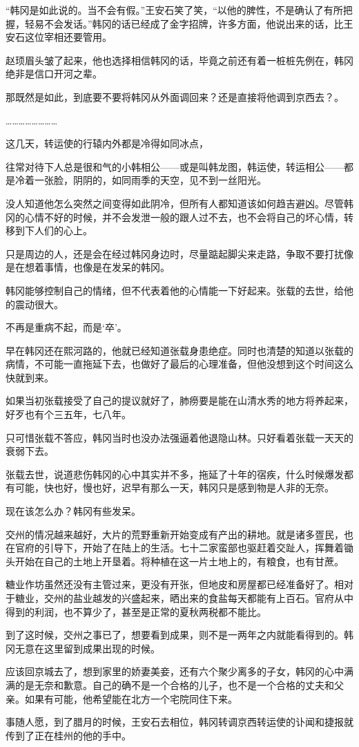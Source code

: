 “韩冈是如此说的。当不会有假。”王安石笑了笑，“以他的脾性，不是确认了有所把握，轻易不会发话。”韩冈的话已经成了金字招牌，许多方面，他说出来的话，比王安石这位宰相还要管用。

赵顼眉头皱了起来，他也选择相信韩冈的话，毕竟之前还有着一桩桩先例在，韩冈绝非是信口开河之辈。

那既然是如此，到底要不要将韩冈从外面调回来？还是直接将他调到京西去？。

……………………

这几天，转运使的行辕内外都是冷得如同冰点，

往常对待下人总是很和气的小韩相公——或是叫韩龙图，韩运使，转运相公——都是冷着一张脸，阴阴的，如同雨季的天空，见不到一丝阳光。

没人知道他怎么突然之间变得如此阴冷，但所有人都知道该如何趋吉避凶。尽管韩冈的心情不好的时候，并不会发泄一般的跟人过不去，也不会将自己的坏心情，转移到下人们的心上。

只是周边的人，还是会在经过韩冈身边时，尽量踮起脚尖来走路，争取不要打扰像是在想着事情，也像是在发呆的韩冈。

韩冈能够控制自己的情绪，但不代表着他的心情能一下好起来。张载的去世，给他的震动很大。

不再是重病不起，而是‘卒’。

早在韩冈还在熙河路的，他就已经知道张载身患绝症。同时也清楚的知道以张载的病情，不可能一直拖延下去，也做好了最后的心理准备，但他没想到这个时间这么快就到来。

如果当初张载接受了自己的提议就好了，肺痨要是能在山清水秀的地方将养起来，好歹也有个三五年，七八年。

只可惜张载不答应，韩冈当时也没办法强逼着他退隐山林。只好看着张载一天天的衰弱下去。

张载去世，说道悲伤韩冈的心中其实并不多，拖延了十年的宿疾，什么时候爆发都有可能，快也好，慢也好，迟早有那么一天，韩冈只是感到物是人非的无奈。

现在该怎么办？韩冈有些发呆。

交州的情况越来越好，大片的荒野重新开始变成有产出的耕地。就是诸多疍民，也在官府的引导下，开始了在陆上的生活。七十二家蛮部也驱赶着交趾人，挥舞着锄头开始在自己的土地上开垦着。将种植在这一片土地上的，有粮食，也有甘蔗。

糖业作坊虽然还没有主管过来，更没有开张，但地皮和房屋都已经准备好了。相对于糖业，交州的盐业越发的兴盛起来，晒出来的食盐每天都能有上百石。官府从中得到的利润，也不算少了，甚至是正常的夏秋两税都不能比。

到了这时候，交州之事已了，想要看到成果，则不是一两年之内就能看得到的。韩冈无意在这里留到成果出现的时候。

应该回京城去了，想到家里的娇妻美妾，还有六个聚少离多的子女，韩冈的心中满满的是无奈和歉意。自己的确不是一个合格的儿子，也不是一个合格的丈夫和父亲。如果有可能，他希望能在北方一个宅院同住下来。

事随人愿，到了腊月的时候，王安石去相位，韩冈转调京西转运使的讣闻和捷报就传到了正在桂州的他的手中。

